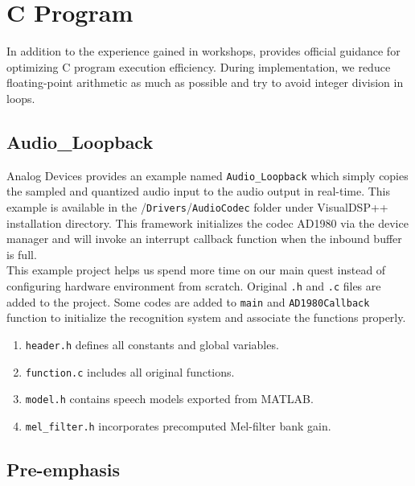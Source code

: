 
\section{C Program}
\label{section:c_program}

In addition to the experience gained in workshops, \cite{TuningCSourceCode} provides official guidance for optimizing C program execution efficiency. During implementation, we reduce floating-point arithmetic as much as possible and try to avoid integer division in loops.

\subsection{Audio\_Loopback}

Analog Devices provides an example named \texttt{Audio\_Loopback} which simply copies the sampled and quantized audio input to the audio output in real-time. This example is available in the /\texttt{Drivers}/\texttt{AudioCodec} folder under VisualDSP++ installation directory. This framework initializes the codec AD1980 via the device manager and will invoke an interrupt callback function when the inbound buffer is full.\\

This example project helps us spend more time on our main quest instead of configuring hardware environment from scratch. Original \texttt{.h} and \texttt{.c} files are added to the project. Some codes are added to \texttt{main} and \texttt{AD1980Callback} function to initialize the recognition system and associate the functions properly.
\begin{enumerate}
\item \texttt{header.h} defines all constants and global variables.
\item \texttt{function.c} includes all original functions.
\item \texttt{model.h} contains speech models exported from MATLAB.
\item \texttt{mel\_filter.h} incorporates precomputed Mel-filter bank gain.
\end{enumerate}


\subsection{Pre-emphasis}

